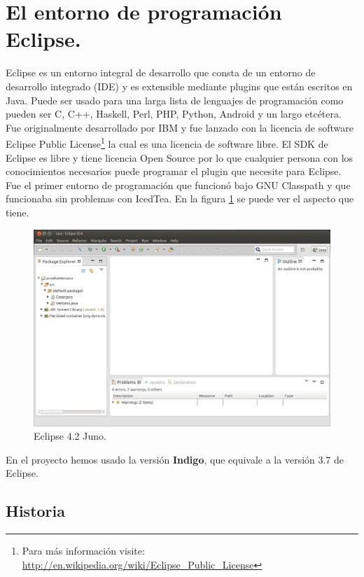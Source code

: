 \section{El entorno de programación Eclipse.}

Eclipse es un entorno integral de desarrollo que consta de un entorno de desarrollo integrado (IDE) y es extensible mediante plugins que están escritos en Java. Puede ser usado para una larga lista de lenguajes de programación como pueden ser C, C++, Haskell, Perl, PHP, Python, Android y un largo etcétera. Fue originalmente desarrollado por IBM y fue lanzado con la licencia de software Eclipse Public License\footnote{Para más información visite: \url{http://en.wikipedia.org/wiki/Eclipse\_Public\_License}} la cual es una licencia de software libre. El SDK de Eclipse es libre y tiene licencia Open Source por lo que cualquier persona con los conocimientos necesarios puede programar el plugin que necesite para Eclipse. Fue el primer entorno de programación que funcionó bajo GNU Classpath y que funcionaba sin problemas con IcedTea. En la figura \ref{fig:pantallaEclipse} se puede ver el aspecto que tiene.

\begin{figure}
  \centering
    \includegraphics[scale=0.5]{./ConocimientosPrevios/imagenes/pantallaEclipse.png}
  \caption{Eclipse 4.2 Juno.}
  \label{fig:pantallaEclipse}
\end{figure} 

En el proyecto hemos usado la versión \textbf{Indigo}, que equivale a la versión 3.7 de Eclipse.

\subsection{Historia}

